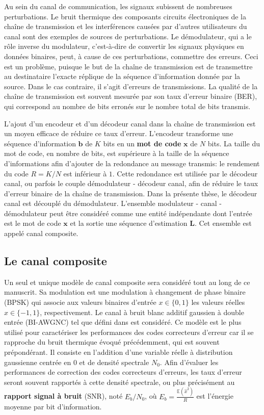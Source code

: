 Au sein du canal de communication, les signaux subissent de nombreuses perturbations. Le bruit thermique des composants circuits électroniques de la chaîne de transmission et les interférences causées par d'autres utilisateurs du canal sont des exemples de sources de perturbations. Le démodulateur, qui a le rôle inverse du modulateur, c'est-à-dire de convertir les signaux physiques en données binaires, peut, à cause de ces perturbations, commettre des erreurs. Ceci est un problème, puisque le but de la chaîne de transmission est de transmettre au destinataire l'exacte réplique de la séquence d'information donnée par la source. Dans le cas contraire, il s'agit d'erreurs de transmissions. La qualité de la chaîne de transmission est souvent mesurée par son taux d'erreur binaire (BER), qui correspond au nombre de bits erronés sur le nombre total de bits transmis.

L'ajout d'un encodeur et d'un décodeur canal dans la chaîne de transmission est un moyen efficace de réduire ce taux d'erreur. L'encodeur transforme une séquence d'information $\mathbold{b}$ de $K$ bits en un \textbf{mot de code} $\mathbold{x}$ de $N$ bits. La taille du mot de code, en nombre de bits, est supérieure à la taille de la séquence d'informations afin d'ajouter de la redondance au message transmis: le rendement du code $R=K/N$ est inférieur à $1$. Cette redondance est utilisée par le décodeur canal, ou parfois le couple démodulateur - décodeur canal, afin de réduire le taux d'erreur binaire de la chaîne de transmission. Dans la présente thèse, le décodeur canal est découplé du démodulateur. L'ensemble modulateur - canal - démodulateur peut être considéré comme une entité indépendante dont l'entrée est le mot de code $\mathbold{x}$ et la sortie une séquence d'estimation $\mathbold{L}$. Cet ensemble est appelé canal composite.

\subsection{Le canal composite}
Un seul et unique modèle de canal composite sera considéré tout au long de ce manuscrit. Sa modulation est une modulation à changement de phase binaire (BPSK) qui associe aux valeurs binaires d'entrée $x\in\{0,1\}$ les valeurs réelles $\hat{x}\in\{-1,1\}$, respectivement.
Le canal à bruit blanc additif gaussien à double entrée (BI-AWGNC) tel que défini dans \cite[Section~1.5.1.3]{ryan2009channel} est considéré. Ce modèle est le plus utilisé pour caractériser les performances des codes correcteurs d'erreur car il se rapproche du bruit thermique évoqué précédemment, qui est souvent prépondérant. Il consiste en l'addition d'une variable réelle à distribution gaussienne centrée en $0$ et de densité spectrale $N_0$. Afin d'évaluer les performances de correction des codes correcteurs d'erreurs, les taux d'erreur seront souvent rapportés à cette densité spectrale, ou plus précisément au \textbf{rapport signal à bruit} (SNR), noté $E_b/N_0$, où $E_b=\frac{\mathbb{E}(\hat{x}^2)}{R}$ est l'énergie moyenne par bit d'information.

